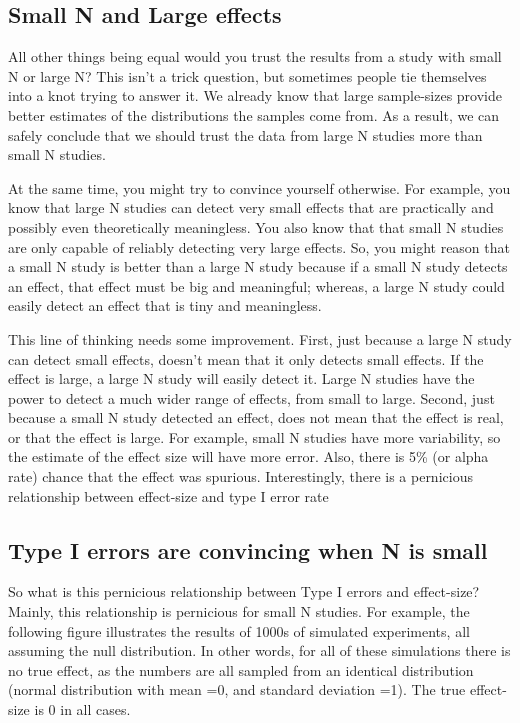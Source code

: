 \documentclass[
  letterpaper,
  DIV=11,
  numbers=noendperiod]{scrreprt}
\begin{document}
\subsection{Small N and Large effects}\label{small-n-and-large-effects}

All other things being equal would you trust the results from a study
with small N or large N? This isn't a trick question, but sometimes
people tie themselves into a knot trying to answer it. We already know
that large sample-sizes provide better estimates of the distributions
the samples come from. As a result, we can safely conclude that we
should trust the data from large N studies more than small N studies.

At the same time, you might try to convince yourself otherwise. For
example, you know that large N studies can detect very small effects
that are practically and possibly even theoretically meaningless. You
also know that that small N studies are only capable of reliably
detecting very large effects. So, you might reason that a small N study
is better than a large N study because if a small N study detects an
effect, that effect must be big and meaningful; whereas, a large N study
could easily detect an effect that is tiny and meaningless.

This line of thinking needs some improvement. First, just because a
large N study can detect small effects, doesn't mean that it only
detects small effects. If the effect is large, a large N study will
easily detect it. Large N studies have the power to detect a much wider
range of effects, from small to large. Second, just because a small N
study detected an effect, does not mean that the effect is real, or that
the effect is large. For example, small N studies have more variability,
so the estimate of the effect size will have more error. Also, there is
5\% (or alpha rate) chance that the effect was spurious. Interestingly,
there is a pernicious relationship between effect-size and type I error
rate

\subsection{Type I errors are convincing when N is
small}\label{type-i-errors-are-convincing-when-n-is-small}

So what is this pernicious relationship between Type I errors and
effect-size? Mainly, this relationship is pernicious for small N
studies. For example, the following figure illustrates the results of
1000s of simulated experiments, all assuming the null distribution. In
other words, for all of these simulations there is no true effect, as
the numbers are all sampled from an identical distribution (normal
distribution with mean =0, and standard deviation =1). The true
effect-size is 0 in all cases.
\end{document}
